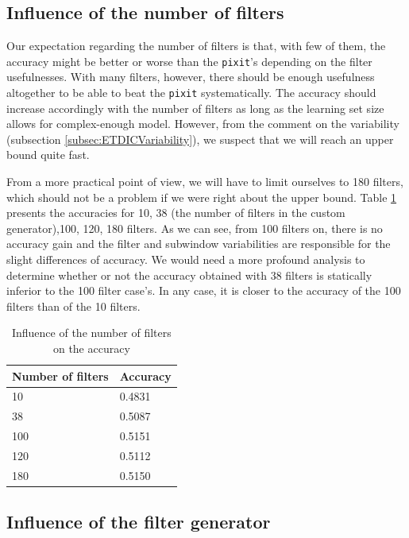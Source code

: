\documentclass[a4paper]{report}
\begin{document}
	\subsection{Influence of the number of filters}
	Our expectation regarding the number of filters is that, with few of them, the accuracy might be better or worse than the \texttt{pixit}'s depending on the filter usefulnesses. With many filters, however, there should be enough usefulness altogether to be able to beat the \texttt{pixit} systematically. The accuracy should increase accordingly with the number of filters as long as the learning set size allows for complex-enough model. However, from the comment on the variability (subsection \ref{subsec:ETDICVariability}), we suspect that we will reach an upper bound quite fast. 
	\par
	From a more practical point of view, we will have to limit ourselves to 180 filters, which should not be a problem if we were right about the upper bound. Table \ref{tab:AccFNbFilt} presents the accuracies for 10, 38 (the number of filters in the custom generator),100, 120, 180 filters. As we can see, from 100 filters on, there is no accuracy gain and the filter and subwindow variabilities are responsible for the slight differences of accuracy. We would need a more profound analysis to determine whether or not the accuracy obtained with 38 filters is statically inferior to the 100 filter case's. In any case, it is closer to the accuracy of the 100 filters than of the 10 filters.
	
	\begin{table}
		\centering
			\begin{tabular}{l|l}
			\hline
			Number of filters & Accuracy \\
			\hline \hline
			10  & 0.4831 \\
			38 & 0.5087 \\
			100 & 0.5151 \\
			120 & 0.5112 \\
			180 & 0.5150 \\
			\hline
			\end{tabular}
		\caption{\label{tab:AccFNbFilt}Influence of the number of filters on the accuracy}
	\end{table}
	
		
	\subsection{Influence of the filter generator}
	
\end{document}
